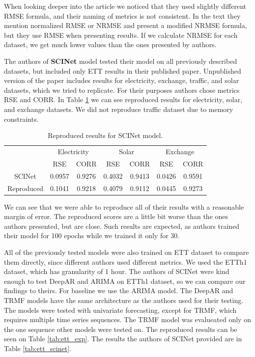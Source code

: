 \documentclass[conference]{IEEEtran}
\begin{document}
When looking deeper into the article we noticed that they used slightly different RMSE formula, and their naming of metrics is not consistent.
In the text they mention normalized RMSE or NRMSE and present a modified NRMSE formula, but they use RMSE when presenting results.
If we calculate NRMSE for each dataset, we get much lower values than the ones presented by authors.

The authors of \textbf{SCINet} model tested their model on all previously described datasets, but included only ETT results in their published paper.
Unpublished version of the paper includes results for electricity, exchange, traffic, and solar datasets, which we tried to replicate.
For their purposes authors chose metrics RSE and CORR.
In Table \ref{tab:scinet_exp} we can see reproduced results for electricity, solar, and exchange datasets.
We did not reproduce traffic dataset due to memory constraints.

\begin{table}[thb]
    \centering
    \begin{tabular}{c|cc|cc|cc}
         & \multicolumn{2}{c}{Electricity} & \multicolumn{2}{c}{Solar} & \multicolumn{2}{c}{Exchange} \\
         & RSE & CORR & RSE & CORR & RSE & CORR \\
        \hline
        SCINet & 0.0957 & 0.9276 & 0.4032 & 0.9413 & 0.0426 & 0.9591 \\
        Reproduced & 0.1041 & 0.9218 & 0.4079 & 0.9112 & 0.0445 & 0.9273 \\
    \end{tabular}
    \caption{Reproduced results for SCINet model.}
    \label{tab:scinet_exp}
\end{table}

We can see that we were able to reproduce all of their results with a reasonable margin of error.
The reproduced scores are a little bit worse than the ones authors presented, but are close.
Such results are expected, as authors trained their model for 100 epochs while we trained it only for 30.

All of the previously tested models were also trained on ETT dataset to compare them directly, since different authors used different metrics.
We used the ETTh1 dataset, which has granularity of 1 hour.
The authors of SCINet were kind enough to test DeepAR and ARIMA on ETTh1 dataset, so we can compare our findings to theirs.
For baseline we use the ARIMA model.
The DeepAR and TRMF models have the same architecture as the authors used for their testing.
The models were tested with univariate forecasting, except for TRMF, which requires multiple time series sequences.
The TRMF model was evalueated only on the one sequence other models were tested on.
The reproduced results can be seen on Table \ref{tab:ett_exp}.
The results the authors of SCINet provided are in Table \ref{tab:ett_scinet}.
\end{document}
